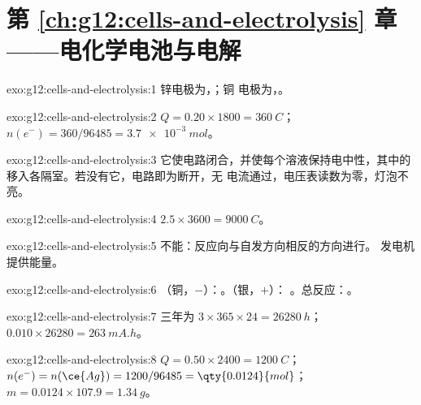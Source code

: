 \section*{第 \ref{ch:g12:cells-and-electrolysis} 章——电化学电池与电解}

\begin{solution}{exo:g12:cells-and-electrolysis:1}
锌电极为，；铜
电极为，。
\end{solution}

\begin{solution}{exo:g12:cells-and-electrolysis:2}
$Q = 0.20 \times 1800 = \qty{360}{C}$；$n(e^-) = 360/96485 =
\qty{3.7e-3}{mol}$。
\end{solution}

\begin{solution}{exo:g12:cells-and-electrolysis:3}
它使电路闭合，并使每个溶液保持电中性，其中的
移入各隔室。若没有它，电路即为断开，无
电流通过，电压表读数为零，灯泡不亮。
\end{solution}

\begin{solution}{exo:g12:cells-and-electrolysis:4}
$2.5 \times 3600 = \qty{9000}{C}$。
\end{solution}

\begin{solution}{exo:g12:cells-and-electrolysis:5}
不能：反应向与自发方向相反的方向进行。
发电机提供能量。
\end{solution}

\begin{solution}{exo:g12:cells-and-electrolysis:6}
（铜，$-$）：。（银，$+$）：
。总反应：。
\end{solution}

\begin{solution}{exo:g12:cells-and-electrolysis:7}
三年为 $3 \times 365 \times 24 = \qty{26280}{h}$；
$0.010 \times 26280 = \qty{263}{mA.h}$。
\end{solution}

\begin{solution}{exo:g12:cells-and-electrolysis:8}
$Q = 0.50 \times 2400 = \qty{1200}{C}$；$n(e^-) = n(\ce{Ag}) =
1200/96485 = \qty{0.0124}{mol}$；$m = 0.0124 \times 107.9 =
\qty{1.34}{g}$。
\end{solution}

